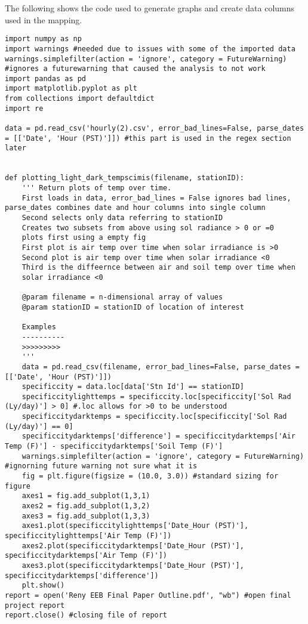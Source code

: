 \documentclass[letterpaper]{article}
\begin{document}
The following shows the code used to generate graphs and create data columns used in the mapping. 
\begin{lstlisting}
import numpy as np
import warnings #needed due to issues with some of the imported data 
warnings.simplefilter(action = 'ignore', category = FutureWarning) #ignores a futurewarning that caused the analysis to not work
import pandas as pd
import matplotlib.pyplot as plt
from collections import defaultdict
import re 

data = pd.read_csv('hourly(2).csv', error_bad_lines=False, parse_dates = [['Date', 'Hour (PST)']]) #this part is used in the regex section later


def plotting_light_dark_tempscimis(filename, stationID):
    ''' Return plots of temp over time.
    First loads in data, error_bad_lines = False ignores bad lines, 
parse_dates combines date and hour columns into single column
    Second selects only data referring to stationID
    Creates two subsets from above using sol radiance > 0 or =0
    plots first using a empty fig
    First plot is air temp over time when solar irradiance is >0
    Second plot is air temp over time when solar irradiance <0
    Third is the diffeernce between air and soil temp over time when 
	solar irradiance <0
    
    @param filename = n-dimensional array of values
    @param stationID = stationID of location of interest
    
    Examples
    ----------
    >>>>>>>>> 
    ''' 
    data = pd.read_csv(filename, error_bad_lines=False, parse_dates = [['Date', 'Hour (PST)']])
    specificcity = data.loc[data['Stn Id'] == stationID]
    specificcitylighttemps = specificcity.loc[specificcity['Sol Rad (Ly/day)'] > 0] #.loc allows for >0 to be understood
    specificcitydarktemps = specificcity.loc[specificcity['Sol Rad (Ly/day)'] == 0]
    specificcitydarktemps['difference'] = specificcitydarktemps['Air Temp (F)'] - specificcitydarktemps['Soil Temp (F)']
    warnings.simplefilter(action = 'ignore', category = FutureWarning) #ignorning future warning not sure what it is
    fig = plt.figure(figsize = (10.0, 3.0)) #standard sizing for figure
    axes1 = fig.add_subplot(1,3,1) 
    axes2 = fig.add_subplot(1,3,2)
    axes3 = fig.add_subplot(1,3,3)
    axes1.plot(specificcitylighttemps['Date_Hour (PST)'], specificcitylighttemps['Air Temp (F)'])
    axes2.plot(specificcitydarktemps['Date_Hour (PST)'], specificcitydarktemps['Air Temp (F)'])
    axes3.plot(specificcitydarktemps['Date_Hour (PST)'], specificcitydarktemps['difference'])
    plt.show()
report = open('Reny EEB Final Paper Outline.pdf', "wb") #open final project report
report.close() #closing file of report
\end{lstlisting}
\end{document}
